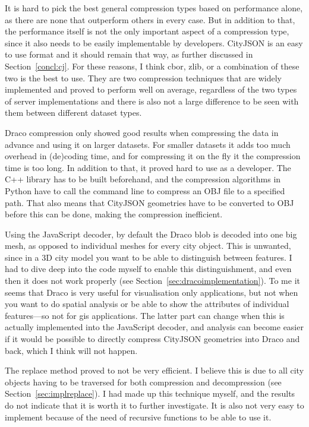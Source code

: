 It is hard to pick the best general compression types based on performance alone, as there are none that outperform others in every case.
But in addition to that, the performance itself is not the only important aspect of a compression type, since it also needs to be easily implementable by developers.
CityJSON is an easy to use format and it should remain that way, as further discussed in Section~\ref{concl:cj}.
For these reasons, I think \ac{cbor}, zlib, or a combination of these two is the best to use.
They are two compression techniques that are widely implemented and proved to perform well on average, regardless of the two types of server implementations and there is also not a large difference to be seen with them between different dataset types.





Draco compression only showed good results when compressing the data in advance and using it on larger datasets.
For smaller datasets it adds too much overhead in (de)coding time, and for compressing it on the fly it the compression time is too long.
In addition to that, it proved hard to use as a developer.
The C++ library has to be built beforehand, and the compression algorithms in Python have to call the command line to compress an OBJ file to a specified path.
That also means that CityJSON geometries have to be converted to OBJ before this can be done, making the compression inefficient.

Using the JavaScript decoder, by default the Draco \ac{blob} is decoded into one big mesh, as opposed to individual meshes for every city object.
This is unwanted, since in a 3D city model you want to be able to distinguish between features.
I had to dive deep into the code myself to enable this distinguishment, and even then it does not work properly (see Section~\ref{sec:dracoimplementation}).
To me it seems that Draco is very useful for visualisation only applications, but not when you want to do spatial analysis or be able to show the attributes of individual features---so not for \ac{gis} applications.
The latter part can change when this is actually implemented into the JavaScript decoder, and analysis can become easier if it would be possible to directly compress CityJSON geometries into Draco and back, which I think will not happen.

The replace method proved to not be very efficient.
I believe this is due to all city objects having to be traversed for both compression and decompression (see Section~\ref{sec:implreplace}).
I had made up this technique myself, and the results do not indicate that it is worth it to further investigate.
It is also not very easy to implement because of the need of recursive functions to be able to use it.

